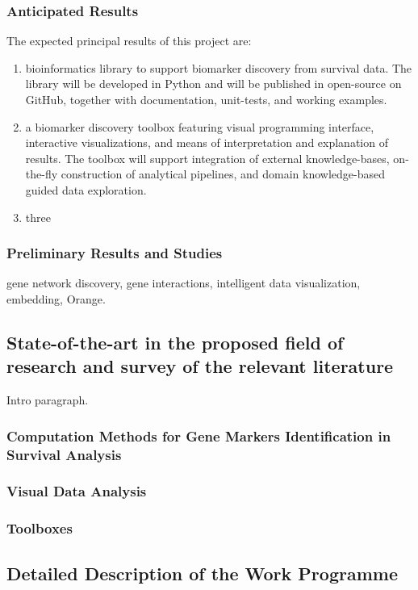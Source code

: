 \documentclass[11pt,a4paper]{article}
\begin{document}
\subsubsection*{Anticipated Results}
The expected principal results of this project are:
\begin{enumerate}
	\item bioinformatics library to support biomarker discovery from survival data. The library will be developed in Python and will be published in open-source on GitHub, together with documentation, unit-tests, and working examples.
	\item a biomarker discovery toolbox featuring visual programming interface, interactive visualizations, and means of interpretation and explanation of results. The toolbox will support integration of external knowledge-bases, on-the-fly construction of analytical pipelines, and domain knowledge-based guided data exploration.
	\item three
\end{enumerate}

\subsubsection*{Preliminary Results and Studies}

gene network discovery, gene interactions, intelligent data visualization, embedding, Orange.

\subsection{State-of-the-art in the proposed field of research and survey of the relevant literature}

Intro paragraph.

\subsubsection*{Computation Methods for Gene Markers Identification in Survival Analysis}
\subsubsection*{Visual Data Analysis}
\subsubsection*{Toolboxes}

\subsection{Detailed Description of the Work Programme}
\end{document}
